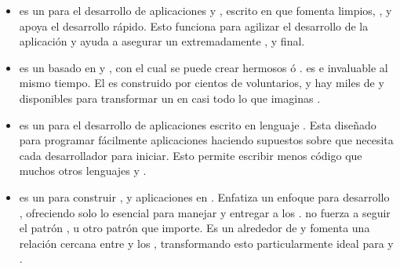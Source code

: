 \begin{itemize}
			\item
				\textbf{\yiiNAME} es un \frameworkPC para el desarrollo de aplicaciones \webINT \freePC y \openSourcePC, escrito en  que fomenta limpios, \dryDesignQA  \designQA, y apoya el desarrollo rápido. Esto funciona para agilizar el desarrollo de la aplicación y ayuda a asegurar un extremadamente \efficientQA, \extensibleQA y \maintainableQA \itemCOM final.
			\item
				\textbf{\wordPressNAME} es un \softwarePC \webINT basado en \phpNAME y \mysqlNAME, con el cual se puede crear hermosos \websiteINT ó \blogINT. \wordPressNAME es \freePC e invaluable al mismo tiempo. 
				El \softwarePC \coreAS es construido por cientos de voluntarios, y hay miles de \pluginsAS y \themesCPT disponibles para transformar un \websiteINT en casi todo lo que imaginas \cite{online_wordPress_org}.

			\item
				\textbf{\rubyonrailsNAME} es un \frameworkPC para el desarrollo de aplicaciones \webINT escrito en lenguaje \rubyNAME. Esta diseñado para programar fácilmente aplicaciones \webINT haciendo supuestos sobre que necesita cada desarrollador para iniciar. Esto permite escribir menos código que muchos otros lenguajes y \frameworksPC \cite{online_technology_rubyonrails}.

			\item
				\textbf{\sinatraNAME} es un \domainSpecificLangPL para construir \websitesINT, \webServiceINT y aplicaciones \webINT en \rubyNAME. Enfatiza un enfoque para desarrollo \minimalisticQA, ofreciendo solo lo esencial para manejar \httpNAME \requestINT y entregar \responsesINT a los \clientsAS. \sinatraNAME no fuerza a seguir el patrón \modelViewConAS, u otro patrón que importe. Es un \wrapperAS \lightweightPL alrededor de \rackMiddleRubyAS y fomenta una relación cercana entre \serviceCPT \apiendpointsAS y los \httpVerbsAS, transformando esto particularmente ideal para \webServicesINT y \apisAS \cite{book_sinatra_oreilly}.


\end{itemize}
